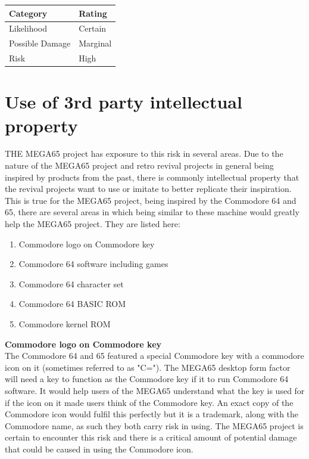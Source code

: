 \begin{tabular}{l|l} %
    	\textbf{Category} 	&	\textbf{Rating} \\
      \hline
     Likelihood			&	Certain \\
     Possible Damage 	& 	Marginal \\
     Risk 				&	High		\\	
    \end{tabular}


\section{Use of 3rd party intellectual property}
THE MEGA65 project has exposure to this risk in several areas. Due to the nature of the MEGA65 project and retro revival projects in general being inspired by products from the past, there is commonly intellectual property that the revival projects want to use or imitate to better replicate their inspiration. This is true for the MEGA65 project, being inspired by the Commodore 64 and 65, there are several areas in which being similar to these machine would greatly help the MEGA65 project. They are listed here:

\begin{enumerate}
\item Commodore logo on Commodore key
\item Commodore 64 software including games
\item Commodore 64 character set
\item Commodore 64 BASIC ROM
\item Commodore kernel ROM
\end{enumerate}

\textbf{Commodore logo on Commodore key} \\
The Commodore 64 and 65 featured a special Commodore key with a commodore icon on it (sometimes referred to as "C="). The MEGA65 desktop form factor will need a key to function as the Commodore key if it to run Commodore 64 software. It would help users of the MEGA65 understand what the key is used for if the icon on it made users think of the Commodore key. An exact copy of the Commodore icon would fulfil this perfectly but it is a trademark, along with the Commodore name, as such they both carry risk in using. The MEGA65 project is certain to encounter this risk and there is a critical amount of potential damage that could be caused in using the Commodore icon. \\

